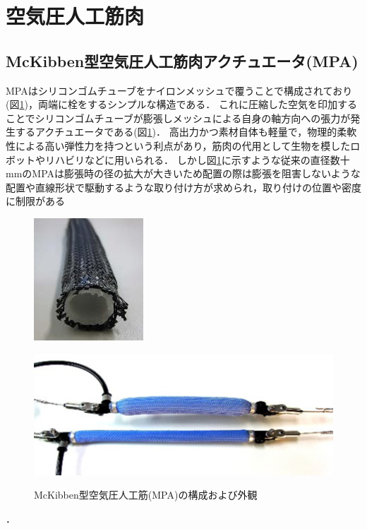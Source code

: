 \newpage
\section{空気圧人工筋肉}
\subsection{McKibben型空気圧人工筋肉アクチュエータ(MPA)}
MPAはシリコンゴムチューブをナイロンメッシュで覆うことで構成されており(図\ref{fig:MPA})，両端に栓をするシンプルな構造である．
これに圧縮した空気を印加することでシリコンゴムチューブが膨張しメッシュによる自身の軸方向への張力が発生するアクチュエータである(図\ref{fig:MPA})．
高出力かつ素材自体も軽量で，物理的柔軟性による高い弾性力を持つという利点があり，筋肉の代用として生物を模したロボットやリハビリなどに用いられる．
しかし図\ref{fig:MPA}に示すような従来の直径数十 mmのMPAは膨張時の径の拡大が大きいため配置の際は膨張を阻害しないような配置や直線形状で駆動するような取り付け方が求められ，取り付けの位置や密度に制限がある
\begin{figure}[b]
    \begin{minipage}{0.49\columnwidth}
      \vspace{4mm}
      \centering
      \includegraphics[scale=1]{pic/MPA_kousei.png}
      \vspace{3mm}
      \label{fig:Structure}
    \end{minipage}
    \begin{minipage}{0.49\columnwidth}
      \vspace{25mm}
      \centering
      \includegraphics[scale=.8]{pic/MPA_dousa.png}
      \label{fig:move}
    \end{minipage}
    \caption{McKibben型空気圧人工筋(MPA)の構成および外観\cite{中西大輔2020}}
    \label{fig:MPA}
  \end{figure}．
